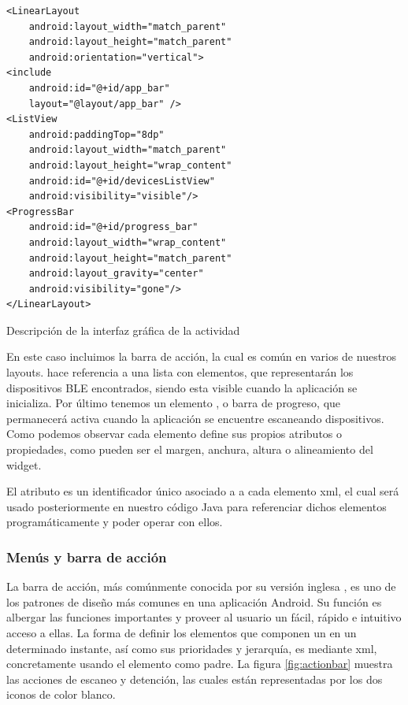 \begin{listing}[!htpb] 
\begin{verbatim}
<LinearLayout
    android:layout_width="match_parent"
    android:layout_height="match_parent"
    android:orientation="vertical">
<include
    android:id="@+id/app_bar"
    layout="@layout/app_bar" />
<ListView
    android:paddingTop="8dp"
    android:layout_width="match_parent"
    android:layout_height="wrap_content"
    android:id="@+id/devicesListView"
    android:visibility="visible"/>
<ProgressBar
    android:id="@+id/progress_bar"
    android:layout_width="wrap_content"
    android:layout_height="match_parent"
    android:layout_gravity="center"
    android:visibility="gone"/>
</LinearLayout>
\end{verbatim}
\caption{Descripción de la interfaz gráfica de la actividad }
\label{code:layout}
\end{listing}
	
	En este caso incluimos la barra de acción, la cual es común en varios de nuestros layouts.  hace referencia a una lista con elementos, que representarán los dispositivos BLE encontrados, siendo esta visible cuando la aplicación se inicializa. Por último tenemos un elemento , o barra de progreso, que permanecerá activa cuando la aplicación se encuentre escaneando dispositivos. Como podemos observar cada elemento define sus propios atributos o propiedades, como pueden ser el margen, anchura, altura o alineamiento del widget.

	El atributo  es un identificador único asociado a a cada elemento xml, el cual será usado posteriormente en nuestro código Java para referenciar dichos elementos programáticamente y poder operar con ellos.

\subsubsection{Menús y barra de acción}

La barra de acción, más comúnmente conocida por su versión inglesa , es uno de los patrones de diseño más comunes en una aplicación Android. Su función es albergar las funciones importantes y proveer al usuario un fácil, rápido e intuitivo acceso a ellas. La forma de definir los elementos que componen un  en un determinado instante, así como sus prioridades y jerarquía, es mediante xml, concretamente usando el elemento  como padre. La figura \ref{fig:actionbar} muestra las acciones de escaneo y detención, las cuales están representadas por los dos iconos de color blanco.

